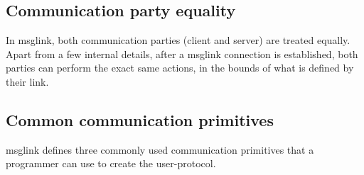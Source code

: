 \documentclass[conference]{IEEEtran}
\begin{document}
\subsection{Communication party equality}

In msglink, both communication parties (client and server) are treated equally. Apart from a few internal details, after a msglink connection is established, both parties can perform the exact same actions, in the bounds of what is defined by their link.


\subsection{Common communication primitives}

msglink defines three commonly used communication primitives that a programmer can use to create the user-protocol.
\end{document}
